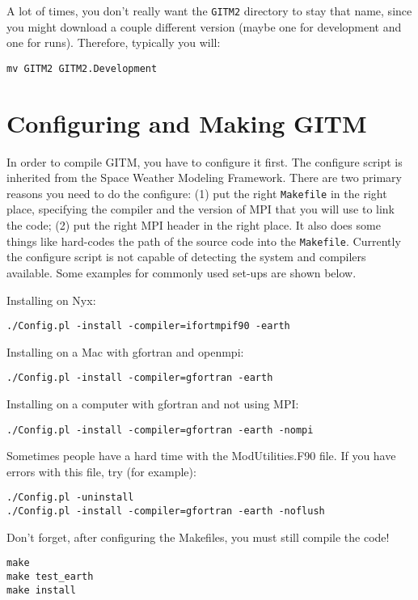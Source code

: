 A lot of times, you don't really want the {\tt GITM2} directory to
stay that name, since you might download a couple different version
(maybe one for development and one for runs).  Therefore, typically
you will:
\begin{verbatim}
mv GITM2 GITM2.Development
\end{verbatim}

\section{Configuring and Making GITM}

In order to compile GITM, you have to configure it first.  The
configure script is inherited from the Space Weather Modeling
Framework.  There are two primary reasons you need to do the
configure: (1) put the right {\tt Makefile} in the right place,
specifying the compiler and the version of MPI that you will use to
link the code; (2) put the right MPI header in the right place.  It
also does some things like hard-codes the path of the source code into
the {\tt Makefile}. Currently the configure script is not capable of detecting the system and compilers available.  Some examples for commonly used set-ups are shown below.

Installing on Nyx:
\begin{verbatim}
./Config.pl -install -compiler=ifortmpif90 -earth
\end{verbatim}

Installing on a Mac with gfortran and openmpi:
\begin{verbatim}
./Config.pl -install -compiler=gfortran -earth
\end{verbatim}

Installing on a computer with gfortran and not using MPI:
\begin{verbatim}
./Config.pl -install -compiler=gfortran -earth -nompi
\end{verbatim}

Sometimes people have a hard time with the ModUtilities.F90 file.  If
you have errors with this file, try (for example):
\begin{verbatim}
./Config.pl -uninstall
./Config.pl -install -compiler=gfortran -earth -noflush
\end{verbatim}

Don't forget, after configuring the Makefiles, you must still compile the code!
\begin{verbatim}
make
make test_earth
make install
\end{verbatim}

